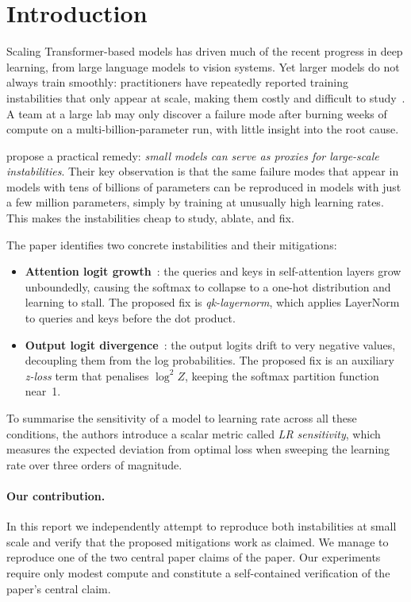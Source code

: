 \section{Introduction}
\label{sec:introduction}

Scaling Transformer-based models has driven much of the recent progress in
deep learning, from large language models to vision systems.
Yet larger models do not always train smoothly: practitioners have repeatedly
reported training instabilities that only appear at scale, making them costly
and difficult to study~\cite{chowdhery2022palm, dehghani2023scaling}.
A team at a large lab may only discover a failure mode after burning weeks of
compute on a multi-billion-parameter run, with little insight into the root
cause.

\citet{wortsman2023smallscale} propose a practical remedy: \emph{small models
can serve as proxies for large-scale instabilities}.
Their key observation is that the same failure modes that appear in models with
tens of billions of parameters can be reproduced in models with just a few
million parameters, simply by training at unusually high learning rates.
This makes the instabilities cheap to study, ablate, and fix.

The paper identifies two concrete instabilities and their mitigations:
\begin{itemize}
  \item \textbf{Attention logit growth}~\cite{dehghani2023scaling}: the
    queries and keys in self-attention layers grow unboundedly, causing the
    softmax to collapse to a one-hot distribution and learning to stall.
    The proposed fix is \emph{qk-layernorm}, which applies LayerNorm to
    queries and keys before the dot product.
  \item \textbf{Output logit divergence}~\cite{chowdhery2022palm}: the output
    logits drift to very negative values, decoupling them from the log
    probabilities.
    The proposed fix is an auxiliary \emph{z-loss} term that penalises
    $\log^2 Z$, keeping the softmax partition function near~1.
\end{itemize}

To summarise the sensitivity of a model to learning rate across all these
conditions, the authors introduce a scalar metric called \emph{LR sensitivity},
which measures the expected deviation from optimal loss when sweeping the
learning rate over three orders of magnitude.

\paragraph{Our contribution.}
In this report we independently attempt to reproduce both instabilities at small scale
and verify that the proposed mitigations work as claimed. We manage to reproduce one of the two central paper claims of the paper. Our experiments require only modest compute and constitute a self-contained verification of the paper's central claim. 